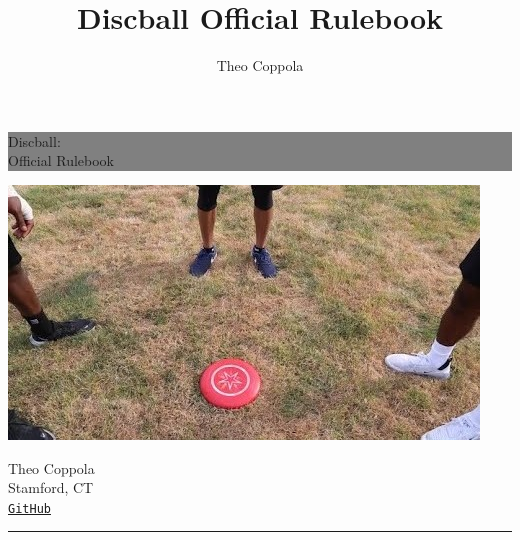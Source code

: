 \documentclass[10pt]{article}
\title{Discball Official Rulebook}
\author{Theo Coppola}
\begin{document}
    \begin{titlepage} %

        \colorbox{grey}{
            \parbox[t]{0.93\textwidth}{ %
                \parbox[t]{0.91\textwidth}{ %
                    \raggedleft%
                    \fontsize{50pt}{80pt}\selectfont %
                    \vspace{0.7cm} %
                    
                    Discball:\\
                    Official Rulebook\\
                    
                    \vspace{0.7cm} %
                }
            }
        }

        \vfill
        
        \begin{center}
            \includegraphics{title_image}
        \end{center}
        
        \vfill %
        
        \parbox[t]{0.93\textwidth}{ %
            \raggedleft%
            \large%
            {\Large Theo Coppola}\\[4pt] %
            Stamford, CT\\[4pt] %
            \texttt{\href{https://github.com/tjcoppola234/Discball}{GitHub}}\\
            
            \hfill\rule{0.2\linewidth}{1pt}%
        }
        
    \end{titlepage}
\end{document}
